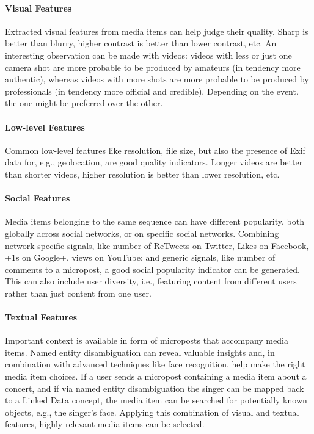 \documentclass{acm_proc_article-sp}
\begin{document}
\paragraph{Visual Features}
Extracted visual features from media items can help judge their quality.
Sharp is better than blurry, higher contrast is better than lower contrast, etc.
An interesting observation can be made with videos: videos with less or just one camera shot are more probable to be produced by amateurs (in tendency more authentic),
whereas videos with more shots are more probable to be produced by professionals (in tendency more official and credible).
Depending on the event, the one might be preferred over the other.

\paragraph{Low-level Features}
Common low-level features like resolution, file size, but also the presence of Exif data for, e.g.,
geolocation, are good quality indicators.
Longer videos are better than shorter videos, higher resolution is better than lower resolution, etc.

\paragraph{Social Features}
Media items belonging to the same sequence can have different popularity,
both globally across social networks, or on specific social networks.
Combining network-specific signals,
like number of ReTweets on Twitter, Likes on Facebook, +1s on Google+, views on YouTube;
and generic signals, like number of comments to a micropost,
a good social popularity indicator can be generated.
This can also include user diversity, i.e.,
featuring content from different users rather than just content from one user.

\paragraph{Textual Features}
Important context is available in form of microposts that accompany media items.
Named entity disambiguation can reveal valuable insights and, in combination with advanced techniques like face recognition,
help make the right media item choices.
If a user sends a micropost containing a media item about a concert, and if via named entity disambiguation the singer can be mapped back to a Linked Data concept,
the media item can be searched for potentially known objects, e.g., the singer's face.
Applying this combination of visual and textual features,
highly relevant media items can be selected.
\end{document}
